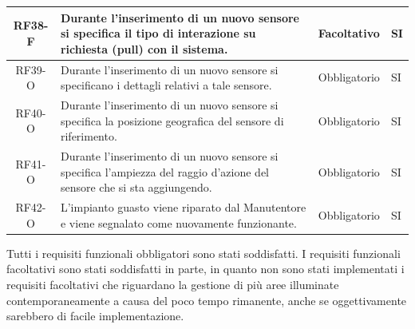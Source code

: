 \documentclass[a4paper, 11pt]{article}
\begin{document}
\begin{longtable}{|c|p{7cm}|c|p{4cm}|}
    \hline
    RF38-F          & Durante l'inserimento di un nuovo sensore si specifica il tipo di interazione su richiesta (pull) con il sistema.                                             & Facoltativo        & SI                   \\
    \hline
    RF39-O          & Durante l'inserimento di un nuovo sensore si specificano i dettagli relativi a tale sensore.                                                                  & Obbligatorio       & SI                   \\
    \hline
    RF40-O          & Durante l'inserimento di un nuovo sensore si specifica la posizione geografica del sensore di riferimento.                                                    & Obbligatorio       & SI                   \\
    \hline
    RF41-O          & Durante l'inserimento di un nuovo sensore si specifica l'ampiezza del raggio d'azione del sensore che si sta aggiungendo.                                     & Obbligatorio       & SI                   \\
    \hline
    RF42-O          & L'impianto guasto viene riparato dal Manutentore e viene segnalato come nuovamente funzionante.                                                               & Obbligatorio       & SI                   \\
    \hline
\end{longtable}
Tutti i requisiti funzionali obbligatori sono stati soddisfatti. I requisiti funzionali facoltativi sono stati soddisfatti in parte, in quanto non sono stati implementati i requisiti facoltativi che riguardano la gestione di più aree illuminate contemporaneamente a causa del poco tempo rimanente, anche se oggettivamente sarebbero di facile implementazione.\\
\end{document}

